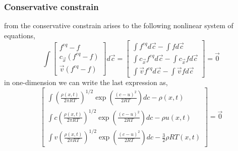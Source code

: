 \begin{frame}
	\frametitle{Conservative constrain}
	from the conservative constrain arises to the following nonlinear system of equations,
	\begin{equation}
		\int 
			\begin{bmatrix}
			f^{eq}-f\\ 
			c_\vec{x}(f^{eq}-f)\\ 
			\vec{v}(f^{eq}-f)
			\end{bmatrix}d\vec{c} 
			=
			\begin{bmatrix}
			\int f^{eq} d\vec{c} - \int f d\vec{c}\\ 
			\int c_\vec{x} f^{eq} d\vec{c} - \int c_\vec{x} f d\vec{c}\\ 
			\int \vec{v} f^{eq} d\vec{c} - \int \vec{v} f d\vec{c}
			\end{bmatrix}
			= \vec{0}
	\end{equation}
	in one-dimension we can write the last expression as, 
	\begin{equation}
			\begin{bmatrix}
			\int \left(\frac{\rho(x,t)}{2 \pi RT}\right)^{1/2} \exp \left(\frac{(c-u)^2}{2RT} \right) dc - \rho(x,t) \\
			\int c \left(\frac{\rho(x,t)}{2 \pi RT}\right)^{1/2} \exp \left(\frac{(c-u)^2}{2RT} \right) dc - \rho u(x,t) \\
			\int v \left(\frac{\rho(x,t)}{2 \pi RT}\right)^{1/2} \exp \left(\frac{(c-u)^2}{2RT} \right) dc - \frac{3}{2} \rho RT(x,t)
			\end{bmatrix} 
			=\vec{0} 
	\label{eq:conservation_constrain_classical}
	\end{equation}
\end{frame}
